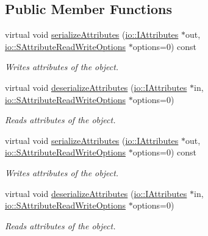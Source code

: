 \subsection*{Public Member Functions}
\begin{DoxyCompactItemize}
\item 
virtual void \hyperlink{classirr_1_1io_1_1IAttributeExchangingObject_a587f7b633366968f0488e1099e9172ef}{serialize\+Attributes} (\hyperlink{classirr_1_1io_1_1IAttributes}{io\+::\+I\+Attributes} $\ast$out, \hyperlink{structirr_1_1io_1_1SAttributeReadWriteOptions}{io\+::\+S\+Attribute\+Read\+Write\+Options} $\ast$options=0) const
\begin{DoxyCompactList}\small\item\em Writes attributes of the object. \end{DoxyCompactList}\item 
virtual void \hyperlink{classirr_1_1io_1_1IAttributeExchangingObject_a013d4ead3736d7fab4bc18c2d61a3e2e}{deserialize\+Attributes} (\hyperlink{classirr_1_1io_1_1IAttributes}{io\+::\+I\+Attributes} $\ast$in, \hyperlink{structirr_1_1io_1_1SAttributeReadWriteOptions}{io\+::\+S\+Attribute\+Read\+Write\+Options} $\ast$options=0)
\begin{DoxyCompactList}\small\item\em Reads attributes of the object. \end{DoxyCompactList}\item 
virtual void \hyperlink{classirr_1_1io_1_1IAttributeExchangingObject_a587f7b633366968f0488e1099e9172ef}{serialize\+Attributes} (\hyperlink{classirr_1_1io_1_1IAttributes}{io\+::\+I\+Attributes} $\ast$out, \hyperlink{structirr_1_1io_1_1SAttributeReadWriteOptions}{io\+::\+S\+Attribute\+Read\+Write\+Options} $\ast$options=0) const
\begin{DoxyCompactList}\small\item\em Writes attributes of the object. \end{DoxyCompactList}\item 
virtual void \hyperlink{classirr_1_1io_1_1IAttributeExchangingObject_a013d4ead3736d7fab4bc18c2d61a3e2e}{deserialize\+Attributes} (\hyperlink{classirr_1_1io_1_1IAttributes}{io\+::\+I\+Attributes} $\ast$in, \hyperlink{structirr_1_1io_1_1SAttributeReadWriteOptions}{io\+::\+S\+Attribute\+Read\+Write\+Options} $\ast$options=0)
\begin{DoxyCompactList}\small\item\em Reads attributes of the object. \end{DoxyCompactList}\end{DoxyCompactItemize}
